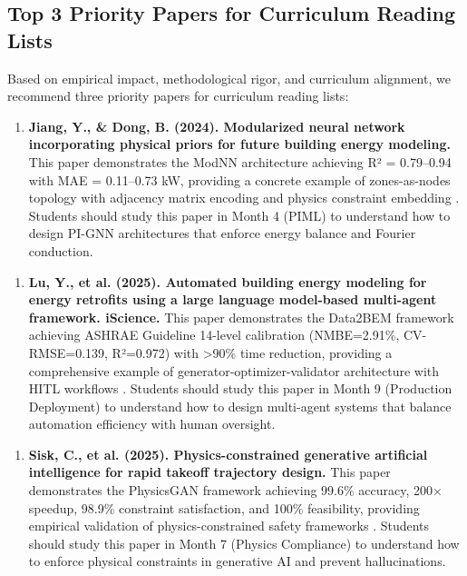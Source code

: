 \documentclass[12pt,a4paper]{article}
\begin{document}
\subsection{Top 3 Priority Papers for Curriculum Reading Lists}
Based on empirical impact, methodological rigor, and curriculum alignment, we recommend three priority papers for curriculum reading lists:
\begin{enumerate}
  \item \textbf{Jiang, Y., \& Dong, B. (2024). Modularized neural network incorporating physical priors for future building energy modeling.} This paper demonstrates the ModNN architecture achieving R² = 0.79--0.94 with MAE = 0.11--0.73 kW, providing a concrete example of zones-as-nodes topology with adjacency matrix encoding and physics constraint embedding \cite{ref25}. Students should study this paper in Month 4 (PIML) to understand how to design PI-GNN architectures that enforce energy balance and Fourier conduction.
\end{enumerate}
\begin{enumerate}[resume]
  \item \textbf{Lu, Y., et al. (2025). Automated building energy modeling for energy retrofits using a large language model-based multi-agent framework. iScience.} This paper demonstrates the Data2BEM framework achieving ASHRAE Guideline 14-level calibration (NMBE=2.91\%, CV-RMSE=0.139, R²=0.972) with >90\% time reduction, providing a comprehensive example of generator-optimizer-validator architecture with HITL workflows \cite{ref36}. Students should study this paper in Month 9 (Production Deployment) to understand how to design multi-agent systems that balance automation efficiency with human oversight.
\end{enumerate}
\begin{enumerate}[resume]
  \item \textbf{Sisk, C., et al. (2025). Physics-constrained generative artificial intelligence for rapid takeoff trajectory design.} This paper demonstrates the PhysicsGAN framework achieving 99.6\% accuracy, 200× speedup, 98.9\% constraint satisfaction, and 100\% feasibility, providing empirical validation of physics-constrained safety frameworks \cite{ref52}. Students should study this paper in Month 7 (Physics Compliance) to understand how to enforce physical constraints in generative AI and prevent hallucinations.
\end{enumerate}
\end{document}
